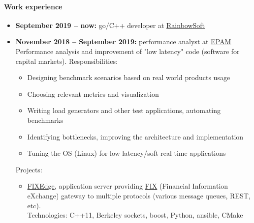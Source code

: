 \documentclass{report}
\begin{document}
\paragraph{Work experience}
\begin{itemize}
\item
  {\bf September 2019 -- now:} go/C++ developer at \href{http://www.rainbowsoft.ru}{RainbowSoft}
\item
  {\bf November 2018 -- September 2019:} performance analyst at \href{http://epam.com}{EPAM}\\
  Performance analysis and improvement of "low latency" code (software for capital markets).
  Responsibilities:
   \begin{itemize}
      \item Designing benchmark scenarios based on real world products usage
      \item Choosing relevant metrics and visualization
      \item Writing load generators and other test applications, automating benchmarks
      \item Identifying bottlenecks, improving the architecture and implementation
      \item Tuning the OS (Linux) for low latency/soft real time applications
   \end{itemize}

  Projects:
  \begin{itemize}
    \item \href{https://www.b2bits.com/trading_solutions/fixedge.html}{FIXEdge}, application server providing
          \href{https://en.wikipedia.org/wiki/Financial_Information_eXchange}{FIX} (Financial Information eXchange)
          gateway to multiple protocols (various message queues, REST, etc). \\
          Technologies: C++11, Berkeley sockets, boost, Python, ansible, CMake
  \end{itemize}


\end{itemize}
\end{document}
